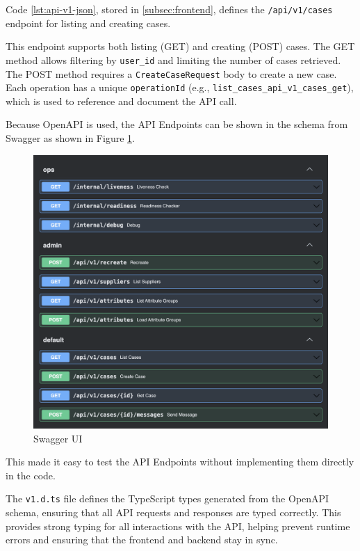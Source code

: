 Code \ref{lst:api-v1-json}, stored in \ref{subsec:frontend}, defines the \texttt{/api/v1/cases} endpoint for listing and
creating cases.

This endpoint supports both listing (GET) and creating (POST) cases. The GET method allows
filtering by \texttt{user\_id} and limiting the number of cases retrieved. The POST method requires a
\texttt{CreateCaseRequest} body to create a new case.
Each operation has a unique \texttt{operationId} (e.g., \texttt{list\_cases\_api\_v1\_cases\_get}), which is
used to reference and document the \ac{API} call.

Because OpenAPI is used, the \ac{API} Endpoints can be shown in the schema from Swagger as shown in Figure
\ref{fig:swaggerui}.

\begin{figure}[H]
\centering
\caption[Swagger UI]{Swagger UI \footnotemark}
\label{fig:swaggerui}
\includegraphics[width=1\textwidth]{abbildungen/Prototyping/Swagger_UI.png}
\end{figure}

This made it easy to test the \ac{API} Endpoints without implementing them directly in the code.

The \texttt{v1.d.ts} file defines the TypeScript types generated from
the OpenAPI schema, ensuring that all \ac{API} requests and
responses are typed correctly. This provides strong typing for all
interactions with the \ac{API}, helping prevent runtime errors and ensuring that the frontend and backend stay in sync.

